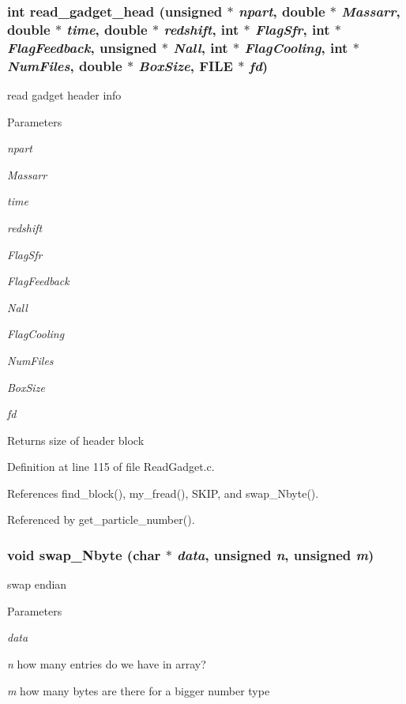 \subsubsection[{read\_\-gadget\_\-head}]{\setlength{\rightskip}{0pt plus 5cm}int read\_\-gadget\_\-head (unsigned $\ast$ {\em npart}, \/  double $\ast$ {\em Massarr}, \/  double $\ast$ {\em time}, \/  double $\ast$ {\em redshift}, \/  int $\ast$ {\em FlagSfr}, \/  int $\ast$ {\em FlagFeedback}, \/  unsigned $\ast$ {\em Nall}, \/  int $\ast$ {\em FlagCooling}, \/  int $\ast$ {\em NumFiles}, \/  double $\ast$ {\em BoxSize}, \/  FILE $\ast$ {\em fd})}\label{ReadGadget_8c_ad9d50e7b7a2074ee223624fca3096827}
read gadget header info 
\begin{DoxyParams}{Parameters}
\item[{\em npart}]\item[{\em Massarr}]\item[{\em time}]\item[{\em redshift}]\item[{\em FlagSfr}]\item[{\em FlagFeedback}]\item[{\em Nall}]\item[{\em FlagCooling}]\item[{\em NumFiles}]\item[{\em BoxSize}]\item[{\em fd}]\end{DoxyParams}
\begin{DoxyReturn}{Returns}
size of header block 
\end{DoxyReturn}


Definition at line 115 of file ReadGadget.c.



References find\_\-block(), my\_\-fread(), SKIP, and swap\_\-Nbyte().



Referenced by get\_\-particle\_\-number().

\subsubsection[{swap\_\-Nbyte}]{\setlength{\rightskip}{0pt plus 5cm}void swap\_\-Nbyte (char $\ast$ {\em data}, \/  unsigned {\em n}, \/  unsigned {\em m})}\label{ReadGadget_8c_a972ae715f1bbaf7462f7c87b18e290a8}
swap endian 
\begin{DoxyParams}{Parameters}
\item[{\em data}]\item[{\em n}]how many entries do we have in array? \item[{\em m}]how many bytes are there for a bigger number type \end{DoxyParams}


